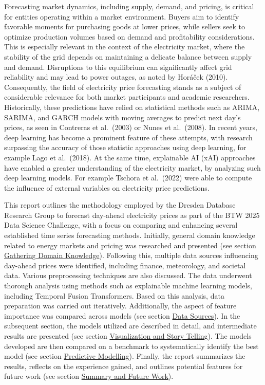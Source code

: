 \documentclass[a4paper]{article}
\begin{document}
    Forecasting market dynamics, including supply, demand, and pricing, is
critical for entities operating within a market environment. Buyers aim
to identify favorable moments for purchasing goods at lower prices,
while sellers seek to optimize production volumes based on demand and
profitability considerations. This is especially relevant in the context
of the electricity market, where the stability of the grid depends on
maintaining a delicate balance between supply and demand. Disruptions to
this equilibrium can significantly affect grid reliability and may lead
to power outages, as noted by Horáček (2010). Consequently, the field of
electricity price forecasting stands as a subject of considerable
relevance for both market participants and academic researchers.
Historically, these predictions have relied on statistical methods such
as ARIMA, SARIMA, and GARCH models with moving averages to predict next
day's prices, as seen in Contreras et al.~(2003) or Nunes et al.~(2008).
In recent years, deep learning has become a prominent feature of these
attempts, with research surpassing the accuracy of those statistic
approaches using deep learning, for example Lago et al.~(2018). At the
same time, explainable AI (xAI) approaches have enabled a greater
understanding of the electricity market, by analyzing such deep learning
models. For example Tschora et al.~(2022) were able to compute the
influence of external variables on electricity price predictions.

This report outlines the methodology employed by the Dresden Database
Research Group to forecast day-ahead electricity prices as part of the
BTW 2025 Data Science Challenge, with a focus on comparing and enhancing
several established time series forecasting methods. Initially, general
domain knowledge related to energy markets and pricing was researched
and presented (see section
\hyperref[gathering-domain-knowledge]{Gathering Domain Knowledge}).
Following this, multiple data sources influencing day-ahead prices were
identified, including finance, meteorology, and societal data. Various
preprocessing techniques are also discussed. The data underwent thorough
analysis using methods such as explainable machine learning models,
including Temporal Fusion Transformers. Based on this analysis, data
preparation was carried out iteratively. Additionally, the aspect of
feature importance was compared across models (see section
\hyperref[data-sources]{Data Sources}). In the subsequent section, the
models utilized are described in detail, and intermediate results are
presented (see section
\hyperref[visualization-and-story-telling]{Visualization and Story Telling}).
The models developed are then compared on a benchmark to systematically
identify the best model (see section
\hyperref[predictive-modeling]{Predictive Modelling}). Finally, the
report summarizes the results, reflects on the experience gained, and
outlines potential features for future work (see section
\hyperref[summary-and-future-work]{Summary and Future Work}).
\end{document}
